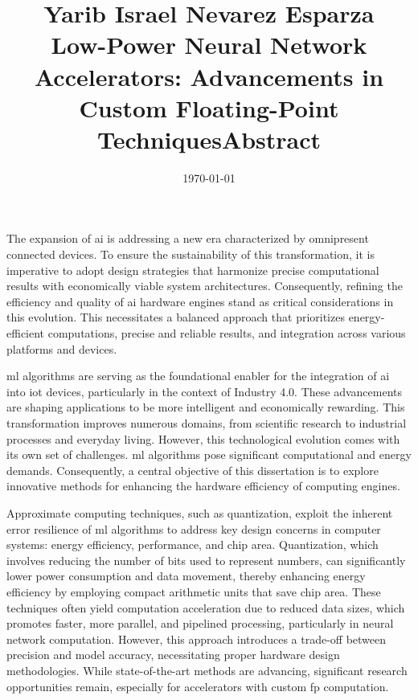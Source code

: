 \documentclass{article}
\title{Yarib Israel Nevarez Esparza \\ Low-Power Neural Network Accelerators:
	Advancements in Custom Floating-Point Techniques}
\author{}
\date{\today}
\begin{document}
\maketitle

\title{\textbf{Abstract}}
\thispagestyle{empty}

The expansion of \gls{ai} is addressing a new era characterized by omnipresent connected devices. To ensure the sustainability of this transformation, it is imperative to adopt design strategies that harmonize precise computational results with economically viable system architectures. Consequently, refining the efficiency and quality of \gls{ai} hardware engines stand as critical considerations in this evolution. This necessitates a balanced approach that prioritizes energy-efficient computations, precise and reliable results, and integration across various platforms and devices.

\gls{ml} algorithms are serving as the foundational enabler for the integration of \gls{ai} into \gls{iot} devices, particularly in the context of Industry 4.0. These advancements are shaping applications to be more intelligent and economically rewarding. This transformation improves numerous domains, from scientific research to industrial processes and everyday living. However, this technological evolution comes with its own set of challenges. \gls{ml} algorithms pose significant computational and energy demands. Consequently, a central objective of this dissertation is to explore innovative methods for enhancing the hardware efficiency of computing engines.

Approximate computing techniques, such as quantization, exploit the inherent error resilience of \gls{ml} algorithms to address key design concerns in computer systems: energy efficiency, performance, and chip area. Quantization, which involves reducing the number of bits used to represent numbers, can significantly lower power consumption and data movement, thereby enhancing energy efficiency by employing compact arithmetic units that save chip area. These techniques often yield computation acceleration due to reduced data sizes, which promotes faster, more parallel, and pipelined processing, particularly in neural network computation. However, this approach introduces a trade-off between precision and model accuracy, necessitating proper hardware design methodologies. While state-of-the-art methods are advancing, significant research opportunities remain, especially for accelerators with custom \gls{fp} computation.
\end{document}
